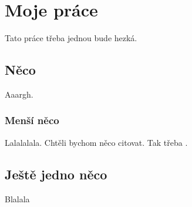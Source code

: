 \chapter{Moje práce}
Tato práce třeba jednou bude hezká.

\section{Něco}
Aaargh.
\subsection{Menší něco}
Lalalalala. Chtěli bychom něco citovat. Tak třeba \cite{smuc}.
\section{Ještě jedno něco}
Blalala
